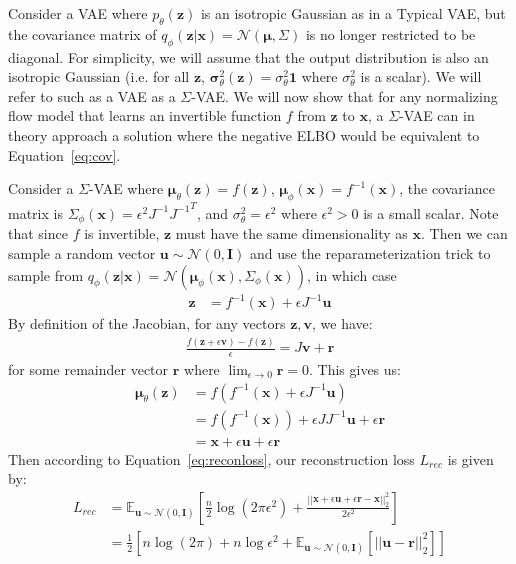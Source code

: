 \documentclass{article}
\begin{document}
Consider a VAE where $p_\theta(\mathbf{z})$ is an isotropic Gaussian as in a Typical VAE, but the covariance matrix of $q_\phi(\mathbf{z}|\mathbf{x})=\mathcal{N}(\boldsymbol \mu, \Sigma)$ is no longer restricted to be diagonal.
For simplicity, we will assume that the output distribution is also an isotropic Gaussian (i.e. for all $\mathbf{z}$,  $\boldsymbol \sigma^2_\theta(\mathbf{z})=\sigma^2_\theta \mathbf{1}$ where $\sigma^2_\theta$ is a scalar).
We will refer to such as a VAE as a $\Sigma$-VAE.
We will now show that for any normalizing flow model that learns an invertible function $f$ from $\mathbf{z}$ to $\mathbf{x}$, a $\Sigma$-VAE can in theory approach a solution where the negative ELBO would be equivalent to Equation~\ref{eq:cov}.

Consider a $\Sigma$-VAE where $\boldsymbol \mu_\theta(\mathbf{z}) = f(\mathbf{z})$, $\boldsymbol \mu_\phi(\mathbf{x}) = f^{-1}(\mathbf{x})$, the covariance matrix is $\Sigma_\phi(\mathbf{x}) = \epsilon^2 J^{-1} {J^{-1}}^T$, and $\sigma^2_\theta = \epsilon^2$ where $\epsilon^2>0$ is a small scalar. Note that since $f$ is invertible, $\mathbf{z}$ must have the same dimensionality as $\mathbf{x}$. Then we can sample a random vector $\mathbf{u}\sim \mathcal{N}(0,\mathbf{I})$ and use the reparameterization trick to sample from $q_\phi(\mathbf{z}|\mathbf{x}) = \mathcal{N}(\boldsymbol \mu_\phi(\mathbf{x}), \Sigma_\phi(\mathbf{x}))$, in which case
\begin{align}
    \mathbf{z} &= f^{-1}(\mathbf{x}) + \epsilon J^{-1} \mathbf{u} 
\end{align}
By definition of the Jacobian, for any vectors $\mathbf{z},\mathbf{v}$, we have:
\begin{align}
    \frac{f(\mathbf{z}+\epsilon \mathbf{v}) - f(\mathbf{z})}{\epsilon} = J\mathbf{v} + \mathbf{r}
\end{align}
for some remainder vector $\mathbf{r}$ where $\lim_{\epsilon \to 0} \mathbf{r} = 0$. This gives us:
\begin{align}
    \boldsymbol \mu_\theta(\mathbf{z}) &= f(f^{-1}(\mathbf{x}) + \epsilon J^{-1} \mathbf{u}) \\
    &= f(f^{-1}(\mathbf{x}))+ \epsilon J J^{-1} \mathbf{u} + \epsilon \mathbf{r}\\
    &= \mathbf{x} + \epsilon \mathbf{u} +  \epsilon \mathbf{r}
\end{align}
Then according to Equation~\ref{eq:reconloss}, our reconstruction loss $L_{rec}$ is given by:
\begin{align}
    L_{rec} &= \mathbb{E}_{\mathbf{u}\sim \mathcal{N}(0,\mathbf{I})} [\frac{n}{2}\log(2 \pi \epsilon^2) + \frac{ ||\mathbf{x} + \epsilon \mathbf{u} +  \epsilon \mathbf{r} - \mathbf{x}||_2^2}{2\epsilon^2}] \\
   & = \frac{1}{2} [n\log(2 \pi ) + n\log \epsilon^2 +  \mathbb{E}_{\mathbf{u}\sim \mathcal{N}(0,\mathbf{I})}[||\mathbf{u}-\mathbf{r}||_2^2]]
\end{align}
\end{document}
